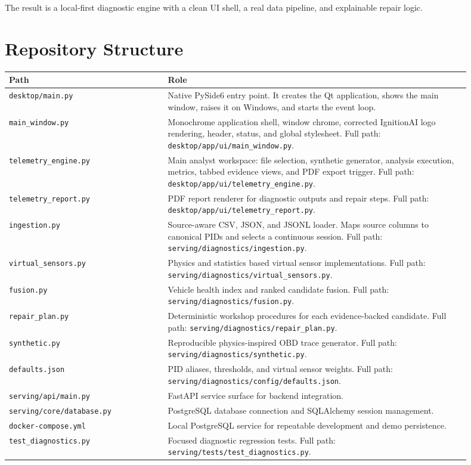 \documentclass[11pt,a4paper]{article}
\begin{document}
The result is a local-first diagnostic engine with a clean UI shell, a real data pipeline, and explainable repair logic.

\section{Repository Structure}

\begin{longtable}{M{0.31\linewidth}L{0.59\linewidth}}
\toprule
\textbf{Path} & \textbf{Role} \\
\midrule
\texttt{desktop/main.py} & Native PySide6 entry point. It creates the Qt application, shows the main window, raises it on Windows, and starts the event loop. \\
\texttt{main\_window.py} & Monochrome application shell, window chrome, corrected IgnitionAI logo rendering, header, status, and global stylesheet. Full path: \texttt{desktop/app/ui/main\_window.py}. \\
\texttt{telemetry\_engine.py} & Main analyst workspace: file selection, synthetic generator, analysis execution, metrics, tabbed evidence views, and PDF export trigger. Full path: \texttt{desktop/app/ui/telemetry\_engine.py}. \\
\texttt{telemetry\_report.py} & PDF report renderer for diagnostic outputs and repair steps. Full path: \texttt{desktop/app/ui/telemetry\_report.py}. \\
\texttt{ingestion.py} & Source-aware CSV, JSON, and JSONL loader. Maps source columns to canonical PIDs and selects a continuous session. Full path: \texttt{serving/diagnostics/ingestion.py}. \\
\texttt{virtual\_sensors.py} & Physics and statistics based virtual sensor implementations. Full path: \texttt{serving/diagnostics/virtual\_sensors.py}. \\
\texttt{fusion.py} & Vehicle health index and ranked candidate fusion. Full path: \texttt{serving/diagnostics/fusion.py}. \\
\texttt{repair\_plan.py} & Deterministic workshop procedures for each evidence-backed candidate. Full path: \texttt{serving/diagnostics/repair\_plan.py}. \\
\texttt{synthetic.py} & Reproducible physics-inspired OBD trace generator. Full path: \texttt{serving/diagnostics/synthetic.py}. \\
\texttt{defaults.json} & PID aliases, thresholds, and virtual sensor weights. Full path: \texttt{serving/diagnostics/config/defaults.json}. \\
\texttt{serving/api/main.py} & FastAPI service surface for backend integration. \\
\texttt{serving/core/database.py} & PostgreSQL database connection and SQLAlchemy session management. \\
\texttt{docker-compose.yml} & Local PostgreSQL service for repeatable development and demo persistence. \\
\texttt{test\_diagnostics.py} & Focused diagnostic regression tests. Full path: \texttt{serving/tests/test\_diagnostics.py}. \\
\bottomrule
\end{longtable}
\end{document}
